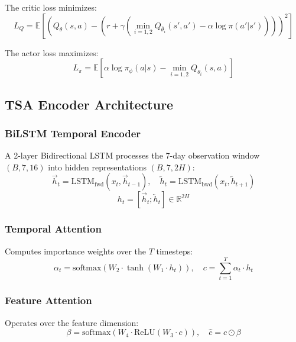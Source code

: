 \documentclass[12pt, a4paper]{article}
\begin{document}
The critic loss minimizes:
\begin{equation}
    L_Q = \mathbb{E}\left[\left(Q_\theta(s,a) - \left(r + \gamma \left(\min_{i=1,2} Q_{\bar\theta_i}(s', a') - \alpha \log \pi(a'|s')\right)\right)\right)^2\right]
\end{equation}

The actor loss maximizes:
\begin{equation}
    L_\pi = \mathbb{E}\left[\alpha \log \pi_\phi(a|s) - \min_{i=1,2} Q_{\theta_i}(s, a)\right]
\end{equation}

\subsection{TSA Encoder Architecture}

\subsubsection{BiLSTM Temporal Encoder}
A 2-layer Bidirectional LSTM processes the 7-day observation window $(B, 7, 16)$ into hidden representations $(B, 7, 2H)$:
\begin{equation}
    \vec{h}_t = \text{LSTM}_{\text{fwd}}(x_t, \vec{h}_{t-1}), \quad \overleftarrow{h}_t = \text{LSTM}_{\text{bwd}}(x_t, \overleftarrow{h}_{t+1})
\end{equation}
\begin{equation}
    h_t = [\vec{h}_t; \overleftarrow{h}_t] \in \mathbb{R}^{2H}
\end{equation}

\subsubsection{Temporal Attention}
Computes importance weights over the $T$ timesteps:
\begin{equation}
    \alpha_t = \text{softmax}\left(W_2 \cdot \tanh(W_1 \cdot h_t)\right), \quad c = \sum_{t=1}^{T} \alpha_t \cdot h_t
\end{equation}

\subsubsection{Feature Attention}
Operates over the feature dimension:
\begin{equation}
    \beta = \text{softmax}(W_4 \cdot \text{ReLU}(W_3 \cdot c)), \quad \hat{c} = c \odot \beta
\end{equation}
\end{document}
